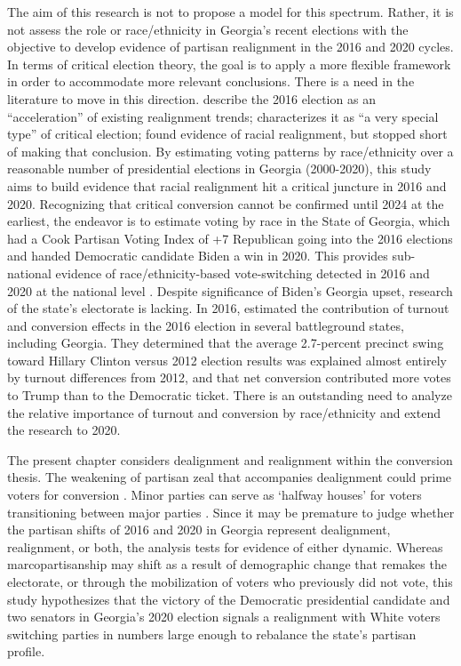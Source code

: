 The aim of this research is not to propose a model for this spectrum. Rather, it is not assess the role or race/ethnicity in Georgia's recent elections with the objective to develop evidence of partisan realignment in the 2016 and 2020 cycles. In terms of critical election theory, the goal is to apply a more flexible framework in order to accommodate more relevant conclusions. There is a need in the literature to move in this direction. \citet{kitschelt_secular_2019} describe the 2016 election as an ``acceleration'' of existing realignment trends; \citet{burnham_current_2016} characterizes it as ``a very special type'' of critical election; \citet{reny_vote_2019} found evidence of racial realignment, but stopped short of making that conclusion. By estimating voting patterns by race/ethnicity over a reasonable number of presidential elections in Georgia (2000-2020), this study aims to build evidence that racial realignment hit a critical juncture in 2016 and 2020. Recognizing that critical conversion cannot be confirmed until 2024 at the earliest, the endeavor is to estimate voting by race in the State of Georgia, which had a Cook Partisan Voting Index of +7 Republican going into the 2016 elections and handed Democratic candidate Biden a win in 2020. This provides sub-national evidence of race/ethnicity-based vote-switching detected in 2016 and 2020 at the national level \citep{reny_vote_2019, mutz_effects_2022}. Despite significance of Biden's Georgia upset, research of the state's electorate is lacking. In 2016, \citet{hill_not_2021} estimated the contribution of turnout and conversion effects in the 2016 election in several battleground states, including Georgia. They determined that the average 2.7-percent precinct swing toward Hillary Clinton versus 2012 election results was explained almost entirely by turnout differences from 2012, and that net conversion contributed more votes to Trump than to the Democratic ticket. There is an outstanding need to analyze the relative importance of turnout and conversion by race/ethnicity and extend the research to 2020. 

The present chapter considers dealignment and realignment within the conversion thesis. The weakening of partisan zeal that accompanies dealignment could prime voters for conversion \citep{stanley_partisan_1988}. Minor parties can serve as `halfway houses' for voters transitioning between major parties \citep{hammond_minor_1976}. Since it may be premature to judge whether the partisan shifts of 2016 and 2020 in Georgia represent dealignment, realignment, or both, the analysis tests for evidence of either dynamic. Whereas marcopartisanship may shift as a result of demographic change that remakes the electorate, or through the mobilization of voters who previously did not vote, this study hypothesizes that the victory of the Democratic presidential candidate and two senators in Georgia's 2020 election signals a realignment with White voters switching parties in numbers large enough to rebalance the state's partisan profile. 

